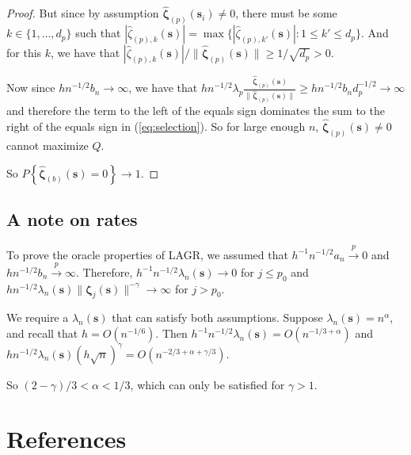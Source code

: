 \documentclass[authoryear, review, 11pt]{elsarticle}
\begin{document}
\begin{proof}
            But since by assumption $\hat{\bm{\zeta}}_{(p)} (\bm{s}_i) \ne 0$, there must be some $k \in \{ 1, \dots, d_p \}$ such that $ | \hat{\zeta}_{(p),k} (\bm{s}) | = \max \{ | \hat{\zeta}_{(p),k'} (\bm{s}) | : 1 \le k' \le d_p \} $. And for this $k$, we have that $| \hat{\zeta}_{(p),k} (\bm{s}) | / \| \hat{\bm{\zeta}}_{(p)} (\bm{s}) \| \ge 1 / \sqrt{d_p} > 0$.

            Now since $h n^{-1/2} b_n \to \infty$, we have that $h n^{-1/2} \lambda_p \frac{ \hat{\bm{\zeta}}_{(p)} (\bm{s}) }{\| \hat{\bm{\zeta}}_{(p)} (\bm{s}) \|} \ge h n^{-1/2} b_n d_p^{-1/2} \to \infty$ and therefore the term to the left of the equals sign dominates the sum to the right of the equals sign in (\ref{eq:selection}). So for large enough $n$, $\hat{\bm{\zeta}}_{(p)} (\bm{s}) \ne 0$ cannot maximize $Q$.
        
            So $P \left\{ \hat{\bm{\zeta}}_{(b)} (\bm{s}) = 0 \right\} \to 1$.
        \end{proof}


    \subsection{A note on rates}
        To prove the oracle properties of LAGR, we assumed that $h^{-1} n^{-1/2} a_n \xrightarrow{p} 0$ and $h n^{-1/2} b_n \xrightarrow{p} \infty$. Therefore, $h^{-1} n^{-1/2} \lambda_n(\bm{s})  \to 0$ for $j \le p_0$ and $h n^{-1/2} \lambda_n(\bm{s}) \| \bm{\zeta}_j(\bm{s}) \|^{-\gamma} \to \infty$ for $j > p_0$.
        
        We require a $\lambda_n(\bm{s})$ that can satisfy both assumptions. Suppose $\lambda_n(\bm{s}) = n^{\alpha}$, and recall that $h = O(n^{-1/6})$. Then $h^{-1} n^{-1/2} \lambda_n(\bm{s}) = O(n^{-1/3 + \alpha})$ and $h n^{-1/2} \lambda_n(\bm{s}) (h \sqrt{n})^{\gamma} = O(n^{-2/3 + \alpha + \gamma/3})$.
        
        So $ (2 - \gamma)/3 < \alpha < 1/3 $, which can only be satisfied for $\gamma > 1$.

\section{References}


\end{document}
